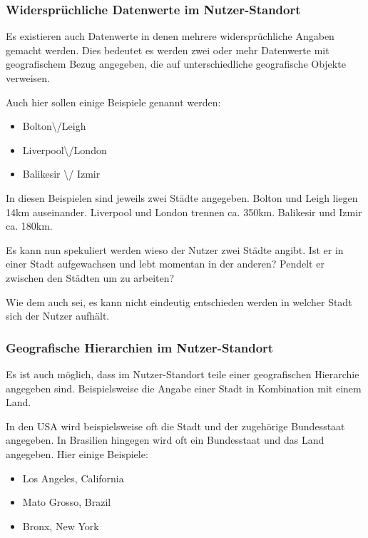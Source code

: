 			\subsubsection*{Widersprüchliche Datenwerte im Nutzer-Standort} \label{subsec:wiederspruechlicheBezuege} 

				Es existieren auch Datenwerte in denen mehrere widersprüchliche Angaben gemacht werden.
				Dies bedeutet es werden zwei oder mehr Datenwerte mit geografischem Bezug angegeben, die auf unterschiedliche geografische Objekte verweisen.

				Auch hier sollen einige Beispiele genannt werden:

				\begin{itemize}
					\item Bolton\textbackslash/Leigh
					\item Liverpool\textbackslash/London
					\item  Balikesir \textbackslash/ Izmir	
				\end{itemize}							
					
				In diesen Beispielen sind jeweils zwei Städte angegeben.
				Bolton und Leigh liegen 14km auseinander.
				Liverpool und London trennen ca. 350km.
				Balikesir und Izmir ca. 180km.

				Es kann nun spekuliert werden wieso der Nutzer zwei Städte angibt.
				Ist er in einer Stadt aufgewachsen und lebt momentan in der anderen?
				Pendelt er zwischen den Städten um zu arbeiten?

				Wie dem auch sei, es kann nicht eindeutig entschieden werden in welcher Stadt sich der Nutzer aufhält.

			\subsubsection*{Geografische Hierarchien im Nutzer-Standort}

				Es ist auch möglich, dass im Nutzer-Standort teile einer geografischen Hierarchie angegeben sind.
				Beispielsweise die Angabe einer Stadt in Kombination mit einem Land.
				
				In den USA wird beispielsweise oft die Stadt und der zugehörige Bundesstaat angegeben.
				In Brasilien hingegen wird oft ein Bundesstaat und das Land angegeben.
				Hier einige Beispiele:

				\begin{itemize}
					\item Los Angeles, California
					\item Mato Grosso, Brazil
					\item Bronx, New York	
				\end{itemize}		

